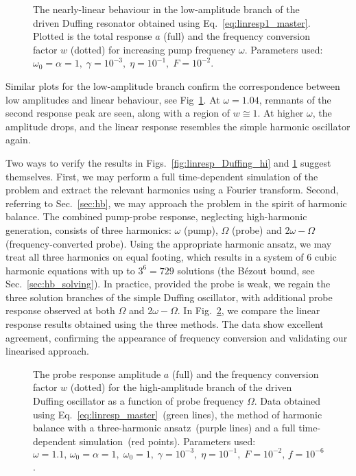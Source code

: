 \begin{figure} [h!] 
	\centering
	
	\caption{The nearly-linear behaviour in the low-amplitude branch of the driven Duffing resonator obtained using Eq.~\eqref{eq:linresp1_master}. Plotted is the total response $a$ (full) and the frequency conversion factor $w$ (dotted) for increasing pump frequency $\omega$. Parameters used: $\omega_0 = \alpha = 1, \; \gamma = 10^{-3} , \; \eta = 10^{-1},\; F = 10^{-2}$.}
	\label{fig:linresp_Duffing_lo} 
\end{figure}

Similar plots for the low-amplitude branch confirm the correspondence between low amplitudes and linear behaviour, see Fig~\ref{fig:linresp_Duffing_lo}. At $\omega = 1.04$, remnants of the second response peak are seen, along with a region of $w \cong 1$. At higher $\omega$, the amplitude drops, and the linear response resembles the simple harmonic oscillator again.

Two ways to verify the results in Figs.~\ref{fig:linresp_Duffing_hi} and \ref{fig:linresp_Duffing_lo} suggest themselves. First, we may perform a full time-dependent simulation of the problem and extract the relevant harmonics using a Fourier transform. Second, referring to Sec.~\ref{sec:hb}, we may approach the problem in the spirit of harmonic balance. The combined pump-probe response, neglecting high-harmonic generation, consists of three harmonics: $\omega$ (pump), $\Omega$ (probe) and  $2\omega -\Omega$ (frequency-converted probe). Using the appropriate harmonic ansatz, we may treat all three harmonics on equal footing, which results in a system of 6 cubic harmonic equations with up to $3^6 = 729$ solutions (the B\'{e}zout bound, see Sec.~\ref{sec:hb_solving}). In practice, provided the probe is weak, we regain the three solution branches of the simple Duffing oscillator, with additional probe response observed at both $\Omega$ and $2 \omega - \Omega$.
In Fig.~\ref{fig:linresp_Duffing_bench}, we compare the linear response results obtained using the three methods. The data show excellent agreement, confirming the appearance of frequency conversion and validating our linearised approach. 

\begin{figure} [h!]
	\centering
	
	\vspace*{-3mm}
	\caption{The probe response amplitude $a$ (full) and the frequency conversion factor $w$ (dotted) for the high-amplitude branch of the driven Duffing oscillator as a function of probe frequency $\Omega$. Data obtained using Eq.~\eqref{eq:linresp_master}~(green lines), the method of harmonic balance with a three-harmonic ansatz~(purple lines) and a full time-dependent simulation~(red points). Parameters used: $\omega=1.1,\,\omega_0 = \alpha = 1, \; \omega_0 = 1, \; \gamma = 10^{-3} , \; \eta = 10^{-1},\; F = 10^{-2},\,f = 10^{-6}$.}
	
	\label{fig:linresp_Duffing_bench} 
\end{figure}

